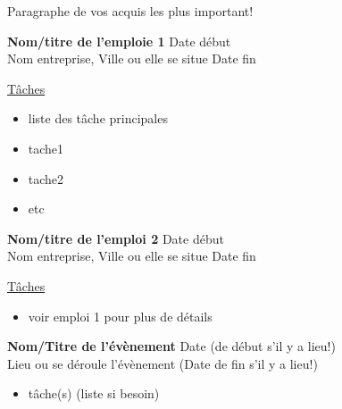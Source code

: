 \documentclass[twoside,letterpaper,12pt]{article}
\begin{document}
\begin{flushleft}
\bigbreak

Paragraphe de vos acquis les plus important!

\bigbreak

{\large \textbf{}}

\bigbreak

\textbf{Nom/titre de l'emploie 1} \hfill  Date début\\
Nom entreprise, Ville ou elle se situe \hfill Date fin \\

\smallbreak

\underline{Tâches}\\

\begin{itemize}[label=\textbullet, font=  \scriptsize]
    \item liste des tâche principales\\
    \item tache1\\
    \item tache2\\
    \item etc
\end{itemize}

\textbf{Nom/titre de l'emploi 2} \hfill Date début\\
Nom entreprise, Ville ou elle se situe \hfill Date fin\\

\bigbreak

\underline{Tâches}\\
\begin{itemize}[label=\textbullet, font=  \scriptsize]
    \item voir emploi 1 pour plus de détails
\end{itemize}

\bigbreak

{\large \textbf{}}

\bigbreak

\textbf{Nom/Titre de l'évènement} \hfill Date (de début s'il y a lieu!)\\
Lieu ou se déroule l'évènement \hfill (Date de fin s'il y a lieu!)\\
\begin{itemize}[label=\textbullet, font=  \scriptsize]
    \item tâche(s) (liste si besoin)
    
\end{itemize}


\end{flushleft}
\end{document}

